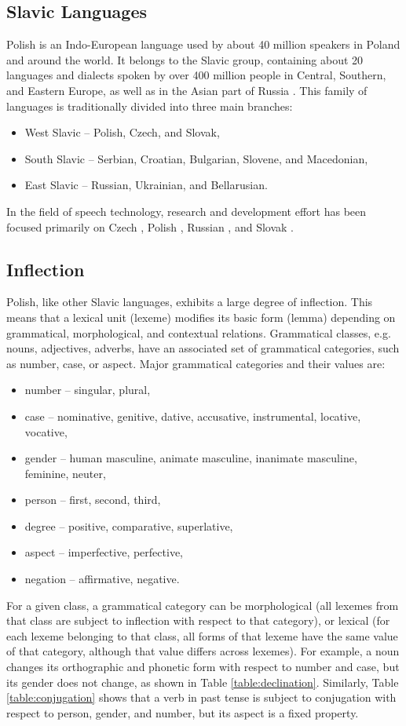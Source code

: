 \subsection{Slavic Languages}
Polish is an Indo-European language used by about 40 million speakers in Poland and around the world. It belongs to the Slavic group, containing about 20 languages and dialects spoken by over 400 million people in Central, Southern, and Eastern Europe, as well as in the Asian part of Russia \cite{karpov2012speech}. This family of languages is traditionally divided into three main branches:
\begin{itemize}
\item West Slavic -- Polish, Czech, and Slovak,
\item South Slavic -- Serbian, Croatian, Bulgarian, Slovene, and Macedonian,
\item East Slavic -- Russian, Ukrainian, and Bellarusian.
\end{itemize}
In the field of speech technology, research and development effort has been focused primarily on Czech \cite{nouza2010adapting, oparin2008morphological}, Polish \cite{zelasko2015linguistically, ziolko2011automatic}, Russian {\cite{karpov2012speech}}, and Slovak \cite{lojka2009finite}.
\subsection{Inflection}
Polish, like other Slavic languages, exhibits a large degree of inflection. This means that a lexical unit (lexeme) modifies its basic form (lemma) depending on grammatical, morphological, and contextual relations. Grammatical classes, e.g. nouns, adjectives, adverbs, have an associated set of grammatical categories, such as number, case, or aspect. Major grammatical categories and their values are:

\begin{itemize}
\item number -- singular, plural,
\item case -- nominative, genitive, dative, accusative, instrumental, locative, vocative,
\item gender -- human masculine, animate masculine, inanimate masculine, feminine, neuter,
\item person -- first, second, third,
\item degree -- positive, comparative, superlative,
\item aspect -- imperfective, perfective,
\item negation -- affirmative, negative.
\end{itemize}
For a given class, a grammatical category can be morphological (all lexemes from that class are subject to inflection with respect to that category), or lexical (for each lexeme belonging to that class, all forms of that lexeme have the same value of that category, although that value differs across lexemes). For example, a noun changes its orthographic and phonetic form with respect to number and case, but its gender does not change, as shown in Table \ref{table:declination}. Similarly, Table \ref{table:conjugation} shows that a verb in past tense is subject to conjugation with respect to person, gender, and number, but its aspect is a fixed property.

